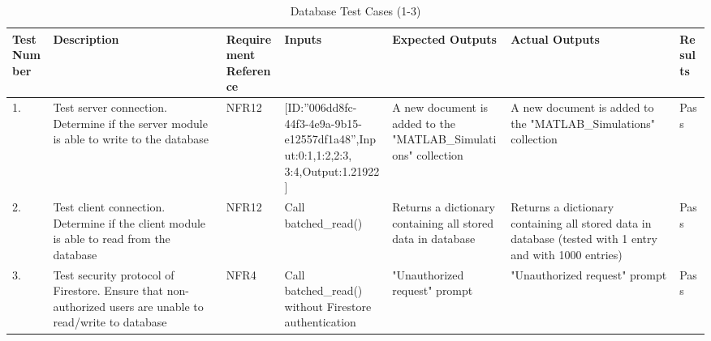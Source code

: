 \documentclass[12pt, titlepage]{article}
\begin{document}
\begin{center}
    \begin{table}[H]
        \centering
        \begin{tabular}{|p{1cm}|p{2.2cm}|p{2.5cm}|p{2.7cm}|p{2.4cm}|p{2.4cm}|p{1.3cm}|}
        \hline
        \bf Test Number & \bf Description & \bf Requirement Reference & \bf Inputs & \bf Expected Outputs & \bf Actual Outputs & \bf Results \\
        \hline
        1. & Test server connection. Determine if the server module is able to write to the database & NFR12 & [ID:”006dd8fc-44f3-4e9a-9b15-e12557df1a48”,\newline Input:{0:1,1:2,2:3,\newline3:4},\newline Output:1.21922\newline2] & A new document is added to the "MATLAB\_Simula\newline tions" collection & A new document is added to the "MATLAB\_Simula\newline tions" collection & Pass\\
        \hline
        2. & Test client connection. Determine if the client module is able to read from the database & NFR12 & Call batched\_read() & Returns a dictionary containing all stored data in database & Returns a dictionary containing all stored data in database (tested with 1 entry and with 1000 entries) & Pass\\
        \hline
        3. & Test security protocol of Firestore. Ensure that non-authorized users are unable to read/write to database & NFR4 & Call batched\_read() without Firestore authentication & "Unauthorized request" prompt & "Unauthorized request" prompt & Pass\\
        \hline
        \end{tabular}
        \caption{Database Test Cases (1-3)}
        \label{tab:my_label12}
    \end{table}
\end{center}
\end{document}

